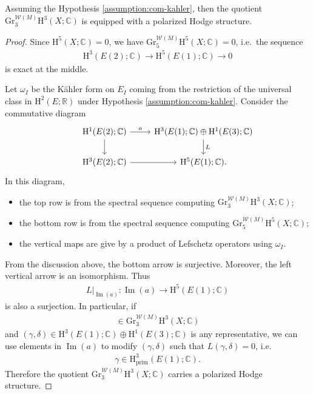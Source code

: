\begin{proposition}
\label{prop:finite-distance-polarized}
Assuming the Hypothesis \ref{assumption:com-kahler}, then the quotient
\(\mathrm{Gr}_{3}^{\mathcal{W}(M)}\mathrm{H}^{3}(X;\mathbb{C})\) is equipped
with a polarized Hodge structure.
\end{proposition}
\begin{proof}
Since \(\mathrm{H}^{5}(X;\mathbb{C})=0\), we have
\(\mathrm{Gr}_{5}^{\mathcal{W}(M)}\mathrm{H}^{5}(X;\mathbb{C})=0\), i.e.~the sequence
\begin{eqnarray*}
\mathrm{H}^{3}(E(2);\mathbb{C})
\to \mathrm{H}^{5}(E(1);\mathbb{C})\to 0
\end{eqnarray*}
is exact at the middle. 

Let \(\omega_{I}\) be the K\"{a}hler form on \(E_{I}\) coming from the
restriction of the universal class
in \(\mathrm{H}^{2}(E;\mathbb{R})\) under Hypothesis \ref{assumption:com-kahler}.
Consider the commutative diagram
\begin{equation}
\begin{tikzcd}
&\mathrm{H}^{1}(E(2);\mathbb{C})
\ar[r,"a"]\ar[d] &\mathrm{H}^{3}(E(1);\mathbb{C})\oplus\mathrm{H}^{1}(E(3);\mathbb{C})\ar[d,"L"]\\
&\mathrm{H}^{3}(E(2);\mathbb{C})
\ar[r] &\mathrm{H}^{5}(E(1);\mathbb{C}).
\end{tikzcd}
\end{equation}
In this diagram, 
\begin{itemize}
\item the top row is from the 
spectral sequence computing \(\mathrm{Gr}_{3}^{\mathcal{W}(M)}\mathrm{H}^{3}(X;\mathbb{C})\);
\item the bottom row is from the 
spectral sequence computing \(\mathrm{Gr}_{5}^{\mathcal{W}(M)}\mathrm{H}^{5}(X;\mathbb{C})\);
\item the vertical maps are give by a product of Lefschetz operators using \(\omega_{I}\).
\end{itemize}
From the discussion above, the bottom arrow is surjective. 
Moreover, the left vertical arrow is an isomorphism.
Thus 
\begin{eqnarray*}
\left.L\right|_{\operatorname{Im}(a)}
\colon \operatorname{Im}(a)\to \mathrm{H}^{5}(E(1);\mathbb{C})
\end{eqnarray*}
is also a surjection. In particular, if 
\begin{eqnarray*}
[\gamma,\delta]\in \mathrm{Gr}_{3}^{\mathcal{W}(M)}\mathrm{H}^{3}(X;\mathbb{C})
\end{eqnarray*}
and \((\gamma,\delta)\in 
\mathrm{H}^{3}(E(1);\mathbb{C})\oplus\mathrm{H}^{1}(E(3);\mathbb{C})\) is any representative,
we can use elements in \(\operatorname{Im}(a)\) to modify \((\gamma,\delta)\)
such that \(L(\gamma,\delta)=0\), i.e.
\begin{eqnarray*}
\gamma\in\mathrm{H}^{3}_{\mathrm{prim}}(E(1);\mathbb{C}).
\end{eqnarray*}
Therefore the quotient
\(\mathrm{Gr}_{3}^{\mathcal{W}(M)}\mathrm{H}^{3}(X;\mathbb{C})\)
carries a polarized Hodge structure.
\end{proof}



